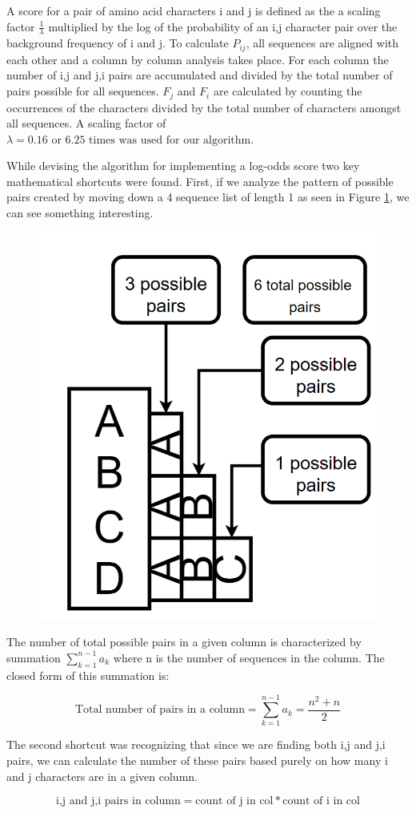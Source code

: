 \documentclass[a4paper,11pt]{article}
\begin{document}
A score for a pair of amino acid characters i and j is defined as the a scaling factor $\frac{1}{\lambda}$ multiplied by the log of the probability of an i,j character pair over the background frequency of i and j. To calculate ${P_{ij}}$, all sequences are aligned with each other and a column by column analysis takes place. For each column the number of i,j and j,i pairs are accumulated and divided by the total number of pairs possible for all sequences.  ${F_{j}}$ and ${F_{i}}$ are calculated by counting the occurrences of the characters divided by the total number of characters amongst all sequences. A scaling factor of $\lambda = 0.16 \text{ or } 6.25 \text{ times was used for our algorithm.}$

While devising the algorithm for implementing a log-odds score two key mathematical shortcuts were found. First, if we analyze the pattern of possible pairs created by moving down a 4 sequence list of length 1 as seen in Figure \ref{fig:screenshot001}, we can see something interesting. 

\begin{figure}[h]
	\centering
	\includegraphics[width=0.25\linewidth]{screenshot001}
	\caption{}
	\label{fig:screenshot001}
\end{figure}

The number of total possible pairs in a given column is characterized by summation $\sum_{k=1}^{n-1} a_k$ where n is the number of sequences in the column. The closed form of this summation is:

\begin{equation}
	\label{eq:closed form}
	{\text{Total number of pairs in a column} = \sum_{k=1}^{n-1} a_k} =\frac{n^{2} + n}{2}
\end{equation}

The second shortcut was recognizing that since we are finding both i,j and j,i pairs, we can calculate the number of these pairs based purely on how many i and j characters are in a given column. 


\begin{equation}
	\label{eq:ij pairs}
	{\text{i,j and j,i pairs in column}} = \text{count of j in col} * \text{count of i in col}
\end{equation}
\end{document}
